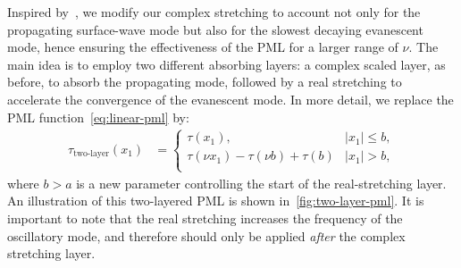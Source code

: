 \documentclass[review,hidelinks,onefignum,onetabnum]{siamart220329}
\begin{document}
Inspired by~\cite{Vial:12}, we modify our complex stretching to account not only for the propagating surface-wave mode but also for the slowest decaying evanescent mode, hence ensuring the effectiveness of the PML for a larger range of $\nu$. The main idea is to employ two different absorbing layers: a complex scaled layer, as before, to absorb the propagating mode, followed by a real stretching to accelerate the convergence of the evanescent mode. In more detail, we replace the PML function~\cref{eq:linear-pml} by:
\begin{align}
    \label{eq:two-layer-pml}
  \tau_{\text{two-layer}}(x_1) &=  
  \begin{cases}
    \tau(x_1), & |x_1| \leq b, \\
    \tau(\nu x_1) - \tau(\nu b) + \tau(b) & |x_1| > b, \\
\end{cases}
\end{align}
where $b > a$ is a new parameter controlling the start of the real-stretching layer. An illustration of this two-layered PML is shown in~\cref{fig:two-layer-pml}. 
It is important to note that the real stretching increases the frequency of the oscillatory mode, and therefore should only be applied \emph{after} the complex stretching layer.
\end{document}
